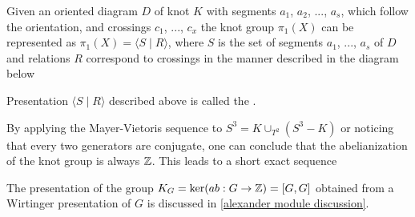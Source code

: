 \begin{definition}\label{wirtinger presentation}
  Given an oriented diagram $D$ of knot $K$ with segments $a_1$, $a_2$, ..., $a_s$, which follow the orientation, and crossings $c_1$, ..., $c_x$ the knot group $\pi_1(X)$ can be represented as $\pi_1(X)=\langle S\;|\;R\rangle$, where $S$ is the set of segments $a_1$, ..., $a_s$ of $D$ and relations $R$ correspond to crossings in the manner described in the diagram below
  \begin{center}
  \end{center}
  Presentation $\langle S\;|\;R\rangle$ described above is called the  \cite[Chapter~6]{livingstone}.
\end{definition}

By applying the Mayer-Vietoris sequence to $S^3=K\cup_{T^2} (S^3-K)$ or noticing that every two generators are conjugate, one can conclude that the abelianization of the knot group is always $\operatorname{\mathbb{Z}}$. This leads to a short exact sequence
\begin{center}
\end{center}

The presentation of the group $K_G=\ker(ab:G\to\operatorname{\mathbb{Z}})=[G,G]$ obtained from a Wirtinger presentation of $G$ is discussed in \cref{alexander module discussion}.

